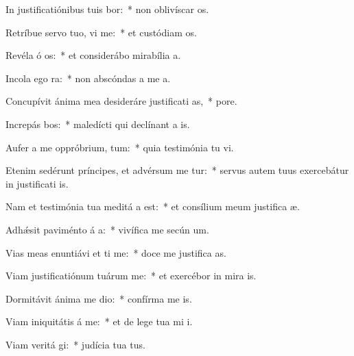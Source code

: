 \item In justificatiónibus tuis bor:~* non oblivíscar  os.
\item Retríbue servo tuo, vi me:~* et custódiam  os.
\item Revéla ó os:~* et considerábo mirabília   a.
\item Incola ego   ra:~* non abscóndas a me  a.
\item Concupívit ánima mea desideráre justificati as,~*   pore.
\item Increpás bos:~* maledícti qui declínant a  is.
\item Aufer a me oppróbrium,  tum:~* quia testimónia tu vi.
\item Etenim sedérunt príncipes, et advérsum me tur:~* servus autem tuus exercebátur in justificati is.
\item Nam et testimónia tua meditá a est:~* et consílium meum justifica æ.
\item Adhǽsit paviménto á a:~* vivífica me secún  um.
\item Vias meas enuntiávi et ti me:~* doce me justifica as.
\item Viam justificatiónum tuárum  me:~* et exercébor in mira is.
\item Dormitávit ánima me  dio:~* confírma me   is.
\item Viam iniquitátis á  me:~* et de lege tua mi i.
\item Viam veritá gi:~* judícia tua   tus.
